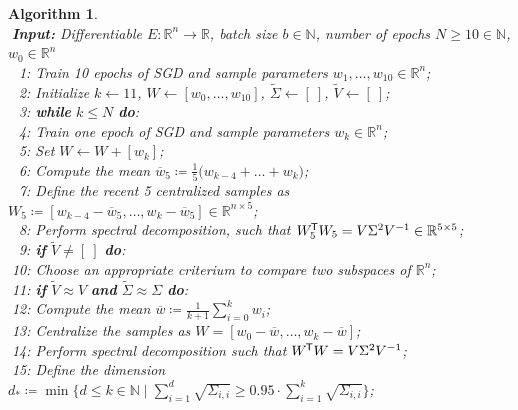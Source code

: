 \documentclass[11pt, a4paper]{article}
\newtheorem{algorithm}[theorem]{Algorithm}
\newcommand{\N}{\mathbb{N}}
\newcommand{\R}{\mathbb{R}}
\newcommand*{\tr}{^{\mkern-1.5mu\mathsf{T}}}
\begin{document}
\begin{algorithm}
\caption{ \textcolor{white}{$\Big |$}} \ \\
\textcolor{white}{$\Big |$}\textbf{Input:} Differentiable $E: \R^n \to \R$, batch size $b \in \N$, number of epochs $N \geq 10 \in \N$, $w_0 \in \R^n$ \\
\textcolor{white}{$\Big |0$}1: Train 10 epochs of SGD and sample parameters $w_1, \dots, w_{10} \in \R^n$; \\
\textcolor{white}{$\Big |0$}2: Initialize $k \leftarrow 11$, $W \leftarrow [ w_0, \dots, w_{10} ]$, $\tilde{\Sigma} \leftarrow [ \ ]$, $\tilde{V} \leftarrow [ \ ]$; \\
\textcolor{white}{$\Big |0$}3: \textbf{while} $k\leq N$ \textbf{do}: \\
\textcolor{white}{$\Big |0$}4: \quad Train one epoch of SGD and sample parameters $w_k \in \R^n$; \\
\textcolor{white}{$\Big |0$}5: \quad Set $W \leftarrow W + [w_k]$; \\
\textcolor{white}{$\Big |0$}6: \quad Compute the mean $\overline{w}_5 \coloneq \frac{1}{5} \big ( w_{k-4} + \dots + w_k \big )$; \\
\textcolor{white}{$\Big |0$}7: \quad Define the recent 5 centralized samples as $W_5 \coloneq [w_{k-4} - \overline{w}_5, \dots, w_k - \overline{w}_5] \in \R^{n \times 5}$; \\
\textcolor{white}{$\Big |0$}8: \quad Perform spectral decomposition, such that $W_5\tr W_5 = V\Sigma^2V^{-1} \in \R^{5 \times 5}$; \\
\textcolor{white}{$\Big |0$}9: \quad \textbf{if} $\tilde{V} \neq [ \ ]$ \textbf{do}: \\
\textcolor{white}{$\Big |$}10: \quad \quad Choose an appropriate criterium to compare two subspaces of $\R^n$; \\
\textcolor{white}{$\Big |$}11: \quad \quad \textbf{if} $\tilde{V} \approx V$ \textbf{and} $\tilde{\Sigma} \approx \Sigma$ \textbf{do}: \\
\textcolor{white}{$\Big |$}12: \quad \quad \quad Compute the mean $\overline{w} \coloneq \frac{1}{k+1} \sum_{i=0}^{k} w_i$; \\
\textcolor{white}{$\Big |$}13: \quad \quad \quad Centralize the samples as $W = [w_0-\overline{w}, \dots, w_k - \overline{w}]$; \\
\textcolor{white}{$\Big |$}14: \quad \quad \quad Perform spectral decomposition such that $W\tr W = V \Sigma^2 V^{-1}$;  \\
\textcolor{white}{$\Big |$}15: \quad \quad \quad Define the dimension $d_* \coloneq \min \big \{ d \leq k \in \N \mid \sum_{i=1}^{d} \sqrt{\Sigma_{i,i}} \geq 0.95 \cdot \sum_{i=1}^{k} \sqrt{\Sigma_{i,i}} \big \}$; \\

\end{algorithm}
\end{document}
